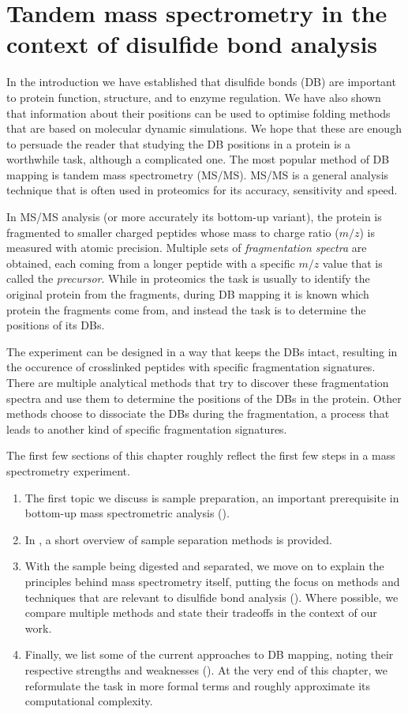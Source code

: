 \chapter{Tandem mass spectrometry in the context of disulfide bond analysis}

In the introduction we have established that disulfide bonds (DB) are important to protein function, structure, and to enzyme regulation. We have also shown that information about their positions can be used to optimise folding methods that are based on molecular dynamic simulations. We hope that these are enough to persuade the reader that studying the DB positions in a protein is a worthwhile task, although a complicated one. The most popular method of DB mapping is tandem mass spectrometry (MS/MS). MS/MS is a general analysis technique that is often used in proteomics for its accuracy, sensitivity and speed.~\cite{gorman2002protein}

In MS/MS analysis (or more accurately its bottom-up variant), the protein is fragmented to smaller charged peptides whose mass to charge ratio (\(m/z\)) is measured with atomic precision. Multiple sets of \emph{fragmentation spectra} are obtained, each coming from a longer peptide with a specific \(m/z\) value that is called the \emph{precursor}. While in proteomics the task is usually to identify the original protein from the fragments, during DB mapping it is known which protein the fragments come from, and instead the task is to determine the positions of its DBs.

The experiment can be designed in a way that keeps the DBs intact, resulting in the occurence of crosslinked peptides with specific fragmentation signatures. There are multiple analytical methods that try to discover these fragmentation spectra and use them to determine the positions of the DBs in the protein. Other methods choose to dissociate the DBs during the fragmentation, a process that leads to another kind of specific fragmentation signatures.

The first few sections of this chapter roughly reflect the first few steps in a mass spectrometry experiment.

\begin{enumerate}
  \item The first topic we discuss is sample preparation, an important prerequisite in bottom-up mass spectrometric analysis ().
  \item In , a short overview of sample separation methods is provided.
  \item With the sample being digested and separated, we move on to explain the principles behind mass spectrometry itself, putting the focus on methods and techniques that are relevant to disulfide bond analysis (). Where possible, we compare multiple methods and state their tradeoffs in the context of our work.
  \item Finally, we list some of the current approaches to DB mapping, noting their respective strengths and weaknesses (). At the very end of this chapter, we reformulate the task in more formal terms and roughly approximate its computational complexity.
\end{enumerate}

